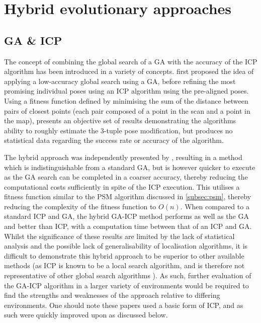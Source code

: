 \documentclass[authoryearcitations]{UoYCSproject}
\begin{document}
\section{Hybrid evolutionary approaches}
\label{sec:hybrid_ea_approaches}
\subsection{GA \& ICP}
The concept of combining the global search of a GA with the accuracy of the ICP algorithm has been introduced in a variety of concepts. \citet{Brunnstrom1996-vo} first proposed the idea of applying a low-accuracy global search using a GA, before refining the most promising individual poses using an ICP algorithm using the pre-aligned poses. Using a fitness function defined by minimising the sum of the distance between pairs of closest points (each pair composed of a point in the scan and a point in the map), \citeauthor{Brunnstrom1996-vo} presents an objective set of results demonstrating the algorithms ability to roughly estimate the 3-tuple pose modification, but produces no statistical data regarding the success rate or accuracy of the algorithm. \newline

The hybrid approach was independently presented by \citet{Martinez2006-ci}, resulting in a method which is indistinguishable from a standard GA, but is however quicker to execute as the GA search can be completed in a coarser accuracy, thereby reducing the computational costs sufficiently in spite of the ICP execution. This utilises a fitness function similar to the PSM algorithm discussed in \autoref{subsec:psm}, thereby reducing the complexity of the fitness function to $O(n)$. When compared to a standard ICP and GA, the hybrid GA-ICP method performs as well as the GA and better than ICP, with a computation time between that of an ICP and GA. Whilst the significance of these results are limited by the lack of statistical analysis and the possible lack of generalisability of localisation algorithms, it is difficult to demonstrate this hybrid approach to be superior to other available methods (as ICP is known to be a local search algorithm, and is therefore not representative of other global search algorithms \cite{Yang2013-gx}). As such, further evaluation of the GA-ICP algorithm in a larger variety of environments would be required to find the strengths and weaknesses of the approach relative to differing environments. One should note these papers used a basic form of ICP, and as such were quickly improved upon as discussed below.
\end{document}

